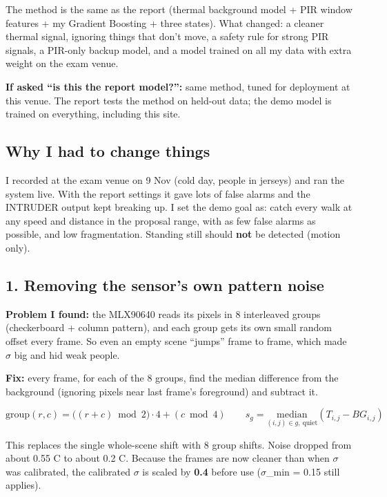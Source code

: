 \documentclass[11pt,a4paper]{article}
\begin{document}
The method is the same as the
report (thermal background
model + PIR window features +
my Gradient Boosting + three
states). What changed: a
cleaner thermal signal,
ignoring things that don't
move, a safety rule for strong
PIR signals, a PIR-only backup
model, and a model trained on
all my data with extra weight
on the exam venue.

\textbf{If asked ``is this the
report model?'':} same method,
tuned for deployment at this
venue. The report tests the
method on held-out data; the
demo model is trained on
everything, including this
site.

\hypertarget{why-i-had-to-change-things}{%
\subsection{Why I had to
change
things}\label{why-i-had-to-change-things}}

I recorded at the exam venue
on 9 Nov (cold day, people in
jerseys) and ran the system
live. With the report settings
it gave lots of false alarms
and the INTRUDER output kept
breaking up. I set the demo
goal as: catch every walk at
any speed and distance in the
proposal range, with as few
false alarms as possible, and
low fragmentation. Standing
still should \textbf{not} be
detected (motion only).

\hypertarget{removing-the-sensors-own-pattern-noise}{%
\subsection{1. Removing the
sensor's own pattern
noise}\label{removing-the-sensors-own-pattern-noise}}

\textbf{Problem I found:} the
MLX90640 reads its pixels in 8
interleaved groups
(checkerboard + column
pattern), and each group gets
its own small random offset
every frame. So even an empty
scene ``jumps'' frame to
frame, which made $\sigma$ big and
hid weak people.

\textbf{Fix:} every frame, for
each of the 8 groups, find the
median difference from the
background (ignoring pixels
near last frame's foreground)
and subtract it.

\[
\text{group}(r,c) = \big((r+c)\bmod 2\big)\cdot 4 + (c \bmod 4) \qquad s_g = \underset{(i,j)\in g,\ \text{quiet}}{\mathrm{median}}(T_{i,j}-BG_{i,j})
\]

This replaces the single
whole-scene shift with 8 group
shifts. Noise dropped from
about 0.55 \textdegree{}C to about 0.2 \textdegree{}C.
Because the frames are now
cleaner than when $\sigma$ was
calibrated, the calibrated $\sigma$
is scaled by \textbf{0.4}
before use ($\sigma$\_min = 0.15
still applies).
\end{document}
